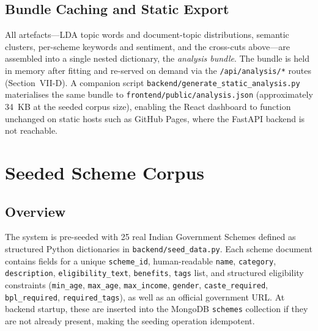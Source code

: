 \documentclass[10pt, journal, twocolumn]{IEEEtran}
\begin{document}
\subsection{Bundle Caching and Static Export}
All artefacts---LDA topic words and document-topic distributions, semantic clusters, per-scheme keywords and sentiment, and the cross-cuts above---are assembled into a single nested dictionary, the \emph{analysis bundle}. The bundle is held in memory after fitting and re-served on demand via the \texttt{/api/analysis/*} routes (Section~VII-D). A companion script \texttt{backend/generate\_static\_analysis.py} materialises the same bundle to \texttt{frontend/public/analysis.json} (approximately 34~KB at the seeded corpus size), enabling the React dashboard to function unchanged on static hosts such as GitHub Pages, where the FastAPI backend is not reachable.

\section{Seeded Scheme Corpus}

\subsection{Overview}
The system is pre-seeded with 25 real Indian Government Schemes defined as structured Python dictionaries in \texttt{backend/seed\_data.py}. Each scheme document contains fields for a unique \texttt{scheme\_id}, human-readable \texttt{name}, \texttt{category}, \texttt{description}, \texttt{eligibility\_text}, \texttt{benefits}, \texttt{tags} list, and structured eligibility constraints (\texttt{min\_age}, \texttt{max\_age}, \texttt{max\_income}, \texttt{gender}, \texttt{caste\_required}, \texttt{bpl\_required}, \texttt{required\_tags}), as well as an official government URL. At backend startup, these are inserted into the MongoDB \texttt{schemes} collection if they are not already present, making the seeding operation idempotent.
\end{document}
